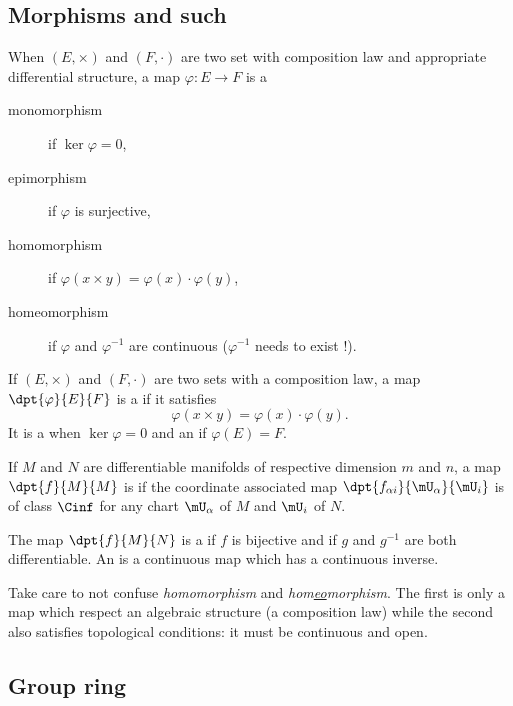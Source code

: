 \subsection{Morphisms and such}

When $(E,\times)$ and $(F,\cdot)$ are two set with composition law and appropriate differential structure, a map $\varphi\colon E\to F$ is a
\begin{description}
\item[monomorphism] if $\ker\varphi=0$,
\item[epimorphism]  if $\varphi$ is surjective,
\item[homomorphism] if $\varphi(x\times y)=\varphi(x)\cdot\varphi(y)$,
\item[homeomorphism] if $\varphi$ and $\varphi^{-1}$ are continuous ($\varphi^{-1}$ needs to exist !).
\end{description}

If $(E,\times)$ and $(F,\cdot)$ are two sets with a composition law, a map $\dpt{\varphi}{E}{F}$ is a  if it satisfies
\[
     \varphi(x\times y)=\varphi(x)\cdot\varphi(y).
\]
It is a  when $\ker\varphi=0$ and an  if $\varphi(E)=F$.

If $M$ and $N$ are differentiable manifolds of respective dimension $m$ and $n$, a map $\dpt{f}{M}{M}$ is  if the coordinate associated map $\dpt{f_{\alpha i}}{\mU_{\alpha}}{\mU_i}$ is of class $\Cinf$ for any chart $\mU_{\alpha}$ of $M$ and $\mU_i$ of $N$.

The map $\dpt{f}{M}{N}$ is a  if $f$ is bijective and if $g$ and $g^{-1}$ are both differentiable. An  is a continuous map which has a continuous inverse.

\begin{remark}
Take care to not confuse \emph{homomorphism} and \emph{hom\underline{eo}morphism}. The first is only a map which respect an algebraic structure (a composition law) while the second also satisfies topological conditions: it must be continuous and open.
\end{remark}

					\subsection{Group ring}

